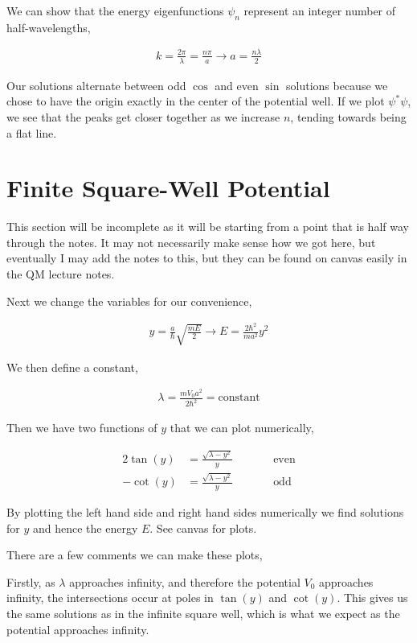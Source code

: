 \documentclass[11pt]{amsart}
\begin{document}
We can show that the energy eigenfunctions $\psi_n$ represent an integer number of half-wavelengths,

\begin{align*}
  k = \frac{2\pi}{\lambda} = \frac{n\pi}{a} \to a = \frac{n\lambda}{2}
\end{align*}

Our solutions alternate between odd $\cos$ and even $\sin$ solutions because we chose to have the origin exactly in the center of the potential well. If we plot $\psi^*\psi$, we see that the peaks get closer together as we increase $n$, tending towards being a flat line.

\section{Finite Square-Well Potential}

This section will be incomplete as it will be starting from a point that is half way through the notes. It may not necessarily make sense how we got here, but eventually I may add the notes to this, but they can be found on canvas easily in the QM lecture notes.

Next we change the variables for our convenience,

\begin{align*}
  y = \frac{a}{\hbar}\sqrt{\frac{mE}{2}} \to E = \frac{2\hbar^2}{ma^2} y^2
\end{align*}

We then define a constant,

\begin{align*}
  \lambda = \frac{mV_0a^2}{2\hbar^2} = \text{constant}
\end{align*}

Then we have two functions of $y$ that we can plot numerically,

\begin{alignat*}{2}
  \tan(y) &= \frac{\sqrt{\lambda - y^2}}{y} \qquad &&\text{even} \\
  -\cot(y) &= \frac{\sqrt{\lambda -y^2}}{y} \qquad &&\text{odd}
\end{alignat*}

By plotting the left hand side and right hand sides numerically we find solutions for $y$ and hence the energy $E$. See canvas for plots.

There are a few comments we can make these plots,

Firstly, as $\lambda$ approaches infinity, and therefore the potential $V_0$ approaches infinity, the intersections occur at poles in $\tan(y)$ and $\cot(y)$. This gives us the same solutions as in the infinite square well, which is what we expect as the potential approaches infinity.
\end{document}
